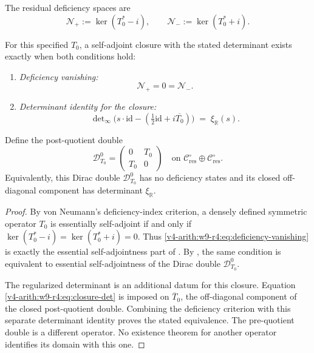\begin{definition}
\label{v4-arith:w9-r4:def:deficiency-spaces}
\ClaimStatusDefinitional The residual deficiency spaces are
\begin{equation}
\label{v4-arith:w9-r4:eq:deficiency-spaces}
\mathcal{N}_{+}:=\ker(T_{0}^{*}-i),
\qquad
\mathcal{N}_{-}:=\ker(T_{0}^{*}+i).
\end{equation}
\end{definition}

\begin{theorem}
\label{v4-arith:w9-r4:thm:dirac-two-test}
\ClaimStatusProvedHere For this specified \(T_0\), a self-adjoint closure with the
stated determinant exists exactly when both conditions hold:
\begin{enumerate}
\item \emph{Deficiency vanishing:}
\begin{equation}
\label{v4-arith:w9-r4:eq:deficiency-vanishing}
\mathcal{N}_{+}=0=\mathcal{N}_{-}.
\end{equation}
\item \emph{Determinant identity for the closure:}
\begin{equation}
\label{v4-arith:w9-r4:eq:closure-det}
\det\nolimits_{\infty}
\bigl(s\cdot\mathrm{id}
-({\tfrac12}\mathrm{id}+i\overline{T_{0}})\bigr)
\;=\;
\xi_{\mathbb{R}}(s).
\end{equation}
\end{enumerate}
Define the post-quotient double
\[
 \mathscr D_{T_0}^{0}
 =\begin{pmatrix}0&T_0\\T_0&0\end{pmatrix}
 \quad\text{on }\mathcal C_{\mathrm{res}}^\circ
                  \oplus\mathcal C_{\mathrm{res}}^\circ.
\]
Equivalently, this Dirac double
\(\mathscr D_{T_0}^{0}\) has no deficiency states and its
closed off-diagonal component has determinant \(\xi_{\mathbb R}\).
\end{theorem}

\begin{proof}
By von Neumann's deficiency-index criterion, a densely defined
symmetric operator \(T_{0}\) is essentially self-adjoint if and only
if
\(\ker(T_{0}^{*}-i)=\ker(T_{0}^{*}+i)=0\). Thus
\eqref{v4-arith:w9-r4:eq:deficiency-vanishing} is exactly the
essential self-adjointness part of
. By
, the same
condition is equivalent to essential self-adjointness of the Dirac
double \(\mathscr D_{T_0}^{0}\).

The regularized determinant is an additional datum for this
closure. Equation
\eqref{v4-arith:w9-r4:eq:closure-det} is imposed on
\(\overline T_0\), the off-diagonal component of the closed
post-quotient double. Combining the deficiency criterion with this
separate determinant identity proves the stated equivalence.
The pre-quotient double is a different operator. No existence theorem for another
operator identifies its domain with this one.
\end{proof}

